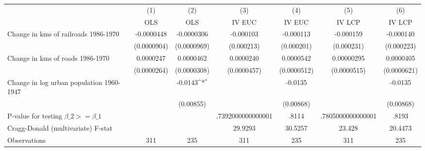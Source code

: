 {
\def\sym#1{\ifmmode^{#1}\else\(^{#1}\)\fi}
\begin{tabular}{l*{6}{c}}
\hline\hline
                &\multicolumn{1}{c}{(1)}&\multicolumn{1}{c}{(2)}&\multicolumn{1}{c}{(3)}&\multicolumn{1}{c}{(4)}&\multicolumn{1}{c}{(5)}&\multicolumn{1}{c}{(6)}\\
                &\multicolumn{1}{c}{OLS}&\multicolumn{1}{c}{OLS}&\multicolumn{1}{c}{IV EUC}&\multicolumn{1}{c}{IV EUC}&\multicolumn{1}{c}{IV LCP}&\multicolumn{1}{c}{IV LCP}\\
\hline
Change in kms of railroads 1986-1970&-0.0000448         &-0.0000306         &-0.000103         &-0.000113         &-0.000159         &-0.000140         \\
                &(0.0000904)         &(0.0000969)         &(0.000213)         &(0.000201)         &(0.000231)         &(0.000223)         \\
[1em]
Change in kms of roads 1986-1970&0.0000247         &0.0000462         &0.0000240         &0.0000542         &0.00000295         &0.0000405         \\
                &(0.0000264)         &(0.0000308)         &(0.0000457)         &(0.0000512)         &(0.0000515)         &(0.0000621)         \\
[1em]
Change in log urban population 1960-1947&                  &  -0.0143\sym{*}  &                  &  -0.0135         &                  &  -0.0135         \\
                &                  &(0.00855)         &                  &(0.00868)         &                  &(0.00868)         \\
\hline
P-value for testing $\beta\_{2} >= \beta\_{1}$&                  &                  &.7392000000000001         &    .8114         &.7805000000000001         &    .8193         \\
Cragg-Donald (multivariate) F-stat&                  &                  &  29.9293         &  30.5257         &   23.428         &  20.4473         \\
Observations    &      311         &      235         &      311         &      235         &      311         &      235         \\
\hline\hline
\end{tabular}
}
